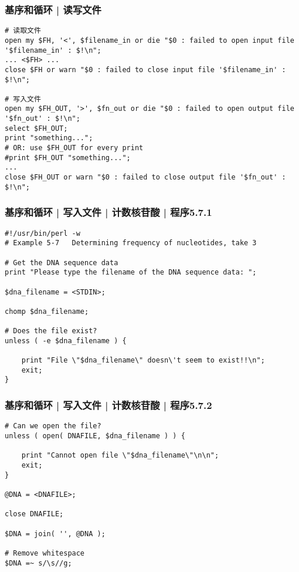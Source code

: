 \begin{frame}[fragile]
  \frametitle{基序和循环 | \alert{读写文件}}
\begin{lstlisting}[basicstyle=\small\tt]
# 读取文件
open my $FH, '<', $filename_in or die "$0 : failed to open input file '$filename_in' : $!\n";
... <$FH> ...
close $FH or warn "$0 : failed to close input file '$filename_in' : $!\n";

# 写入文件
open my $FH_OUT, '>', $fn_out or die "$0 : failed to open output file '$fn_out' : $!\n";
select $FH_OUT;
print "something...";
# OR: use $FH_OUT for every print
#print $FH_OUT "something...";
... 
close $FH_OUT or warn "$0 : failed to close output file '$fn_out' : $!\n";
\end{lstlisting}
\end{frame}

\begin{frame}[fragile]
  \frametitle{基序和循环 | 写入文件 | 计数核苷酸 | 程序5.7.1}
  \vspace{-0.5em}
\begin{lstlisting}[firstnumber=1,basicstyle=\footnotesize\tt,numberstyle=\scriptsize]
#!/usr/bin/perl -w
# Example 5-7   Determining frequency of nucleotides, take 3

# Get the DNA sequence data
print "Please type the filename of the DNA sequence data: ";

$dna_filename = <STDIN>;

chomp $dna_filename;

# Does the file exist?
unless ( -e $dna_filename ) {

    print "File \"$dna_filename\" doesn\'t seem to exist!!\n";
    exit;
}
\end{lstlisting}
\end{frame}

\begin{frame}[fragile]
  \frametitle{基序和循环 | 写入文件 | 计数核苷酸 | 程序5.7.2}
\begin{lstlisting}[firstnumber=18,basicstyle=\small\tt]
# Can we open the file?
unless ( open( DNAFILE, $dna_filename ) ) {

    print "Cannot open file \"$dna_filename\"\n\n";
    exit;
}

@DNA = <DNAFILE>;

close DNAFILE;

$DNA = join( '', @DNA );

# Remove whitespace
$DNA =~ s/\s//g;
\end{lstlisting}
\end{frame}

